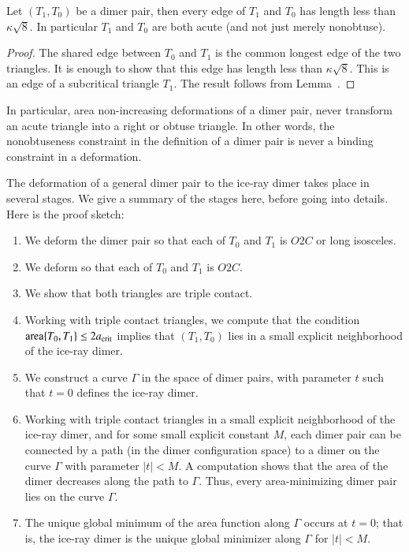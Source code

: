 \begin{lemma}  
  Let $(T_1,T_0)$ be a dimer pair, then every edge of $T_1$ and $T_0$
  has length less than $\kappa\sqrt8$.  In particular $T_1$ and $T_0$
  are both acute (and not just merely nonobtuse).
\end{lemma}

\begin{proof}  
  The shared edge between $T_0$ and $T_1$ is the common longest edge
  of the two triangles.  It is enough to show that this edge has
  length less than $\kappa\sqrt8$.  This is an edge of a subcritical
  triangle $T_1$. The result follows from Lemma~.
\end{proof}

In particular, area non-increasing deformations of a dimer pair, never
transform an acute triangle into a right or obtuse triangle.  In other
words, the nonobtuseness constraint in the definition of a dimer pair
is never a binding constraint in a deformation.

The deformation of a general dimer pair to the ice-ray dimer takes
place in several stages.  We give a summary of the stages here, before
going into details.  Here is the proof sketch:

\begin{enumerate}
\item We deform the dimer pair so that each of $T_0$ and $T_1$ is
  $O2C$ or long isosceles.
\item We deform so that each of $T_0$ and $T_1$ is $O2C$.
\item We show that both triangles are triple contact.
\item Working with triple contact triangles, we compute that the
  condition ${\operatorname{area}}\{T_0,T_1\}\le 2a_\text{crit}$ implies that $(T_1,T_0)$
  lies in a small explicit neighborhood of the ice-ray dimer.
\item We construct a curve $\Gamma$ in the space of dimer pairs, with
  parameter $t$ such that $t=0$ defines the ice-ray dimer.
\item Working with triple contact triangles in a small explicit
  neighborhood of the ice-ray dimer, and for some small explicit
  constant $M$, each dimer pair can be connected by a path (in the
  dimer configuration space) to a dimer on the curve $\Gamma$ with
  parameter $|t|<M$.  A computation shows that the area of the dimer
  decreases along the path to $\Gamma$.  Thus, every area-minimizing
  dimer pair lies on the curve $\Gamma$.
\item The unique global minimum of the area function along $\Gamma$
  occurs at $t=0$; that is, the ice-ray dimer is the unique global
  minimizer along $\Gamma$ for $|t|<M$.
\end{enumerate}

